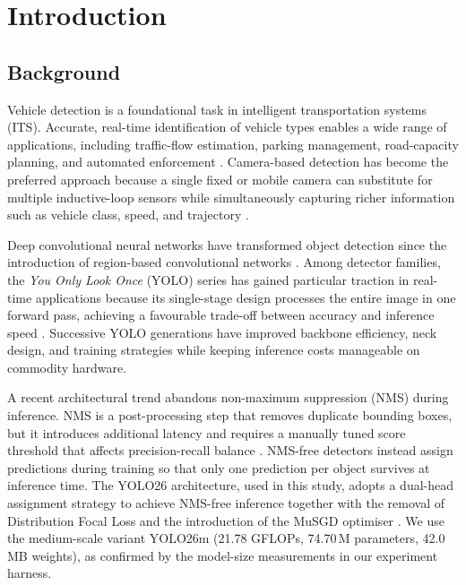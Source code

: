 \section{Introduction}
\label{sec:introduction}

\subsection{Background}

Vehicle detection is a foundational task in intelligent transportation systems (ITS).
Accurate, real-time identification of vehicle types enables a wide range of applications,
including traffic-flow estimation, parking management, road-capacity planning, and
automated enforcement \cite{dilek2023sensors}.
Camera-based detection has become the preferred approach because a single fixed or
mobile camera can substitute for multiple inductive-loop sensors while simultaneously
capturing richer information such as vehicle class, speed, and trajectory
\cite{leduc2008road}.

Deep convolutional neural networks have transformed object detection since the
introduction of region-based convolutional networks \cite{ren2015faster}.
Among detector families, the \textit{You Only Look Once} (YOLO) series has gained
particular traction in real-time applications because its single-stage design
processes the entire image in one forward pass, achieving a favourable trade-off
between accuracy and inference speed \cite{terven2023mlke}.
Successive YOLO generations have improved backbone efficiency, neck design, and
training strategies while keeping inference costs manageable on commodity hardware.

A recent architectural trend abandons non-maximum suppression (NMS) during inference.
NMS is a post-processing step that removes duplicate bounding boxes, but it introduces
additional latency and requires a manually tuned score threshold that affects
precision-recall balance \cite{wang2024yolov10}.
NMS-free detectors instead assign predictions during training so that only one
prediction per object survives at inference time.
The YOLO26 architecture, used in this study, adopts a dual-head assignment strategy
to achieve NMS-free inference together with the removal of Distribution Focal Loss and
the introduction of the MuSGD optimiser \cite{yolo262023}.
We use the medium-scale variant YOLO26m (21.78 GFLOPs, 74.70\,M parameters, 42.0\,MB
weights), as confirmed by the model-size measurements in our experiment harness.

